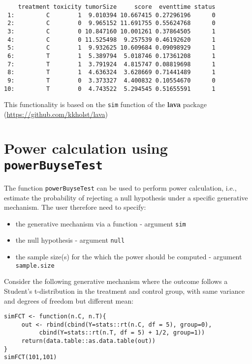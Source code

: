 \documentclass[12pt]{article}
\begin{document}
\begin{verbatim}
    treatment toxicity tumorSize     score  eventtime status
 1:         C        1  9.010394 10.667415 0.27296196      0
 2:         C        0  9.965152 11.691755 0.55624768      0
 3:         C        0 10.847160 10.001261 0.37864505      1
 4:         C        0 11.525498  9.257539 0.46192620      1
 5:         C        1  9.932625 10.609684 0.09098929      1
 6:         T        1  5.389794  5.018746 0.17361208      1
 7:         T        1  3.791924  4.815747 0.08819698      1
 8:         T        1  4.636324  3.628669 0.71441489      1
 9:         T        0  3.373327  4.400832 0.10554670      0
10:         T        0  4.743522  5.294545 0.51655591      1
\end{verbatim}

This functionality is based on the \texttt{sim} function of the \textbf{lava}
package (\url{https://github.com/kkholst/lava})

\clearpage

\section{Power calculation using \texttt{powerBuyseTest}}
\label{sec:org524c672}

The function \texttt{powerBuyseTest} can be used to perform power
calculation, i.e., estimate the probability of rejecting a null
hypothesis under a specific generative mechanism. The user therefore
need to specify:
\begin{itemize}
\item the generative mechanism via a function \hfill - argument \texttt{sim}
\item the null hypothesis \hfill - argument \texttt{null}
\item the sample size(s) for the which the power should be computed  \hfill - argument \texttt{sample.size}
\end{itemize}

\bigskip

Consider the following generative mechanism where the outcome follows
a Student's t-distribution in the treatment and control group, with same
variance and degrees of freedom but different mean:
\lstset{language=r,label= ,caption= ,captionpos=b,numbers=none}
\begin{lstlisting}
simFCT <- function(n.C, n.T){
     out <- rbind(cbind(Y=stats::rt(n.C, df = 5), group=0),
		  cbind(Y=stats::rt(n.T, df = 5) + 1/2, group=1))
     return(data.table::as.data.table(out))
}
simFCT(101,101)
\end{lstlisting}
\end{document}
